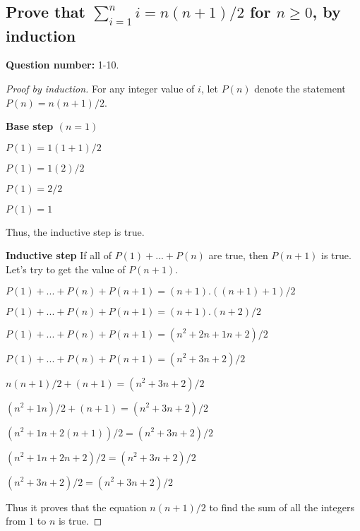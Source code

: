 \subsection{Prove that $\sum_{i=1}^{n} i = n(n+1)/2$ for $n \geq 0$, by induction}
  \textbf{Question number:} 1-10.

  \begin{proof}[Proof by induction]

    For any integer value of $i$, let $P(n)$ denote the statement $P(n) =
    n(n+1)/2$.

    \textbf{Base step $(n=1)$}

    $P(1) = 1(1+1)/2$

    $P(1) = 1(2)/2$

    $P(1) = 2/2$

    $P(1) = 1$

    Thus, the inductive step is true.

    \textbf{Inductive step}
    If all of $P(1) + ... + P(n)$ are true, then $P(n+1)$ is true. Let's try to
    get the value of $P(n+1)$.

    $P(1) + ... + P(n) + P(n+1) = (n+1).((n+1)+1)/2$

    $P(1) + ... + P(n) + P(n+1) = (n+1).(n+2)/2$

    $ P(1) + ... + P(n) + P(n+1) = (n^2 + 2n + 1n + 2)/2$

    $ P(1) + ... + P(n) + P(n+1) = (n^2 + 3n + 2) / 2$

    $ n(n+1)/2 + (n+1) = (n^2 + 3n + 2) / 2$

    $ (n^2 + 1n)/2 + (n+1) = (n^2 + 3n + 2) / 2$

    $ (n^2 + 1n + 2(n+1))/2 = (n^2 + 3n + 2) / 2$

    $ (n^2 + 1n + 2n + 2)/2 = (n^2 + 3n + 2) / 2$

    $ (n^2 + 3n + 2)/2 = (n^2 + 3n + 2) / 2$

    Thus it proves that the equation $n(n+1)/2$ to find the sum of all the
    integers from $1$ to $n$ is true.
    \qedhere
  \end{proof}
